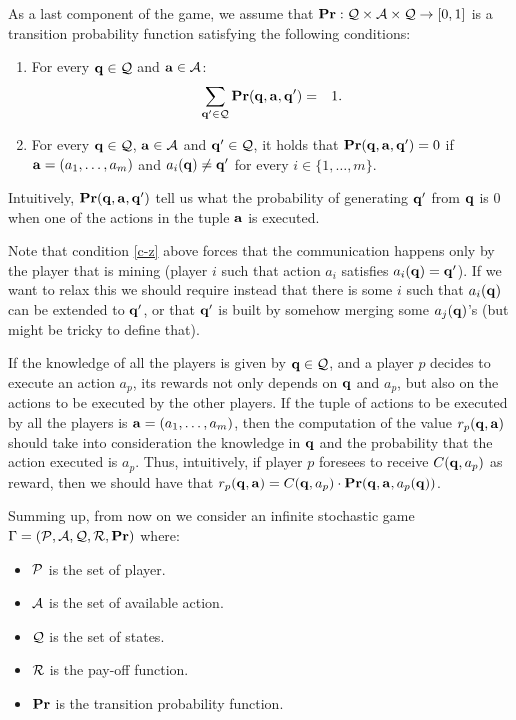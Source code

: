 \documentclass{article}
\begin{document}
As a last component of the game, we assume that $\mathbf{Pr} : \mathcal{Q} \times \mathcal{A} \times \mathcal{Q} \to [0,1]$ is a transition probability function satisfying the following conditions:
\begin{enumerate}
\item For every $\mathbf{q} \in \mathcal{Q}$ and $\mathbf{a} \in \mathcal{A}$:
\begin{eqnarray*}
\sum_{\mathbf{q}' \in \mathcal{Q}} \mathbf{Pr}(\mathbf{q}, \mathbf{a}, \mathbf{q}' ) & = & 1.
\end{eqnarray*}

\item \label{c-z} For every $\mathbf{q} \in \mathcal{Q}$, $\mathbf{a} \in \mathcal{A}$ and $\mathbf{q}' \in \mathcal{Q}$, it holds that $\mathbf{Pr}(\mathbf{q}, \mathbf{a}, \mathbf{q}') = 0$ if $\mathbf{a} = (a_1, \ldots, a_m)$ and $a_i(\mathbf{q}) \neq \mathbf{q}'$ for every $i \in \{1, \ldots, m\}$.
\end{enumerate}
Intuitively, $\mathbf{Pr}(\mathbf{q}, \mathbf{a}, \mathbf{q}')$ tell us what the probability of generating $\mathbf{q}'$ from $\mathbf{q}$ is 0 when one of the actions in the tuple $\mathbf{a}$ is executed.


Note that condition \ref{c-z} above forces that the communication happens only by the player that is mining (player $i$ such that 
action $a_i$ satisfies $a_i(\mathbf{q}) = \mathbf{q}'$). If we want to relax this we should require instead that there is some $i$ such that $a_i(\mathbf{q})$ can be extended to $\mathbf{q}'$, or that $\mathbf{q}'$ is built by somehow merging some $a_j(\mathbf{q})$'s (but might be tricky to define that).


If the knowledge of all the players is given by $\mathbf{q} \in \mathcal{Q}$, and a player $p$ decides to execute an action $a_p$, its rewards not only depends on $\mathbf{q}$ and $a_p$, but also on the actions to be executed by the other players. If the tuple of actions to be executed by all the players is $\mathbf{a} = (a_1, \ldots, a_m)$, then the computation of the value $r_p(\mathbf{q}, \mathbf{a})$ should take into consideration the knowledge in $\mathbf{q}$ and the probability that the action executed is $a_p$. Thus, intuitively, if player $p$ foresees to receive $C(\mathbf{q}, a_p)$ as reward, then we should have that $r_p(\mathbf{q}, \mathbf{a}) = C(\mathbf{q}, a_p) \cdot \mathbf{Pr}(\mathbf{q}, \mathbf{a}, a_p(\mathbf{q}))$.


Summing up, from now on we consider an infinite stochastic game $\Gamma = (\mathcal{P},\mathcal{A},\mathcal{Q},\mathcal{R},\mathbf{Pr})$ where:
\begin{itemize}
	\item $\mathcal{P}$ is the set of player.
	\item $\mathcal{A}$ is the set of available action.
	\item $\mathcal{Q}$ is the set of states.
	\item $\mathcal{R}$ is the pay-off function.
	\item $\mathbf{Pr}$ is the transition probability function.
\end{itemize} 
\end{document}
